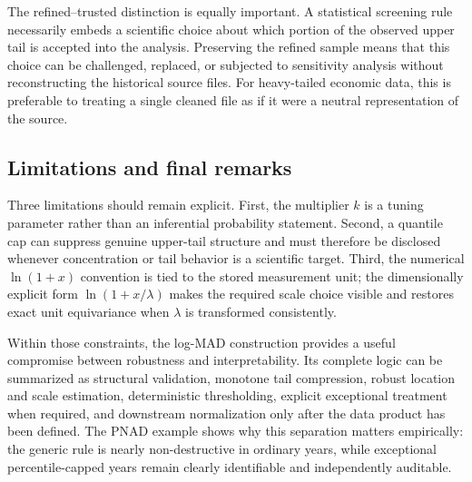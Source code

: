 \documentclass[12pt]{article}
\numberwithin{equation}{section}
\begin{document}
The refined--trusted distinction is equally important. A statistical screening rule necessarily embeds a scientific choice about which portion of the observed upper tail is accepted into the analysis. Preserving the refined sample means that this choice can be challenged, replaced, or subjected to sensitivity analysis without reconstructing the historical source files. For heavy-tailed economic data, this is preferable to treating a single cleaned file as if it were a neutral representation of the source.

\subsection{Limitations and final remarks}

Three limitations should remain explicit. First, the multiplier $k$ is a tuning parameter rather than an inferential probability statement. Second, a quantile cap can suppress genuine upper-tail structure and must therefore be disclosed whenever concentration or tail behavior is a scientific target. Third, the numerical $\ln(1+x)$ convention is tied to the stored measurement unit; the dimensionally explicit form $\ln(1+x/\lambda)$ makes the required scale choice visible and restores exact unit equivariance when $\lambda$ is transformed consistently.

Within those constraints, the log-MAD construction provides a useful compromise between robustness and interpretability. Its complete logic can be summarized as structural validation, monotone tail compression, robust location and scale estimation, deterministic thresholding, explicit exceptional treatment when required, and downstream normalization only after the data product has been defined. The PNAD example shows why this separation matters empirically: the generic rule is nearly non-destructive in ordinary years, while exceptional percentile-capped years remain clearly identifiable and independently auditable.



\end{document}
